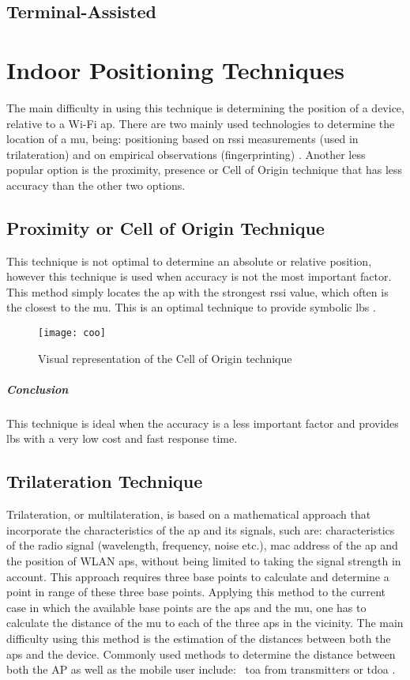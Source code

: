 \subsection{Terminal-Assisted}
\section{Indoor Positioning Techniques}
The main difficulty in using this technique is determining the position of a device, relative to a Wi-Fi \acrfull{ap}. There are two mainly used technologies to determine the location of a \acrfull{mu}, being: positioning based on \acrshort{rssi} measurements (used in trilateration) and on empirical observations (fingerprinting) \cite{Frank2009}. Another less popular option is the proximity, presence or Cell of Origin technique that has less accuracy than the other two options.
\subsection{Proximity or Cell of Origin Technique}
This technique is not optimal to determine an absolute or relative position, however this technique is used when accuracy is not the most important factor. This method simply locates the \acrshort{ap} with the strongest \acrshort{rssi} value, which often is the closest to the \acrlong{mu}. This is an optimal technique to provide symbolic \acrlong{lbs} \cite{Sakpere2017}.
\begin{figure}[h!]
\centering
\texttt{[image: coo]}
\caption{Visual representation of the Cell of Origin technique ~\cite[p.12]{S2016}}
\label{fig:coo}
\end{figure}
\subparagraph{Conclusion} This technique is ideal when the accuracy is a less important factor and provides \acrlong{lbs} with a very low cost and fast response time.
\subsection{Trilateration Technique}
Trilateration, or multilateration, is based on a mathematical approach that incorporate the characteristics of the \acrshort{ap} and its signals, such are: characteristics of the radio signal (wavelength, frequency, noise etc.), \acrfull{mac} address of the \acrlong{ap} and the position of WLAN \acrshort{ap}s, without being limited to taking the signal strength in account. This approach requires three base points to calculate and determine a point in range of these three base points. Applying this method to the current case in which the available base points are the \acrshort{ap}s and the \acrshort{mu}, one has to calculate the distance of the \acrlong{mu} to each of the three \acrshort{ap}s in the vicinity. The main difficulty using this method is the estimation of the distances between both the \acrshort{ap}s and the device. Commonly used methods to determine the distance between both the AP as well as the mobile user include: \, \acrfull{toa} from transmitters or \acrfull{tdoa} \cite[p.~1]{Shchekotov} \cite[p.~60]{Mautz}.
